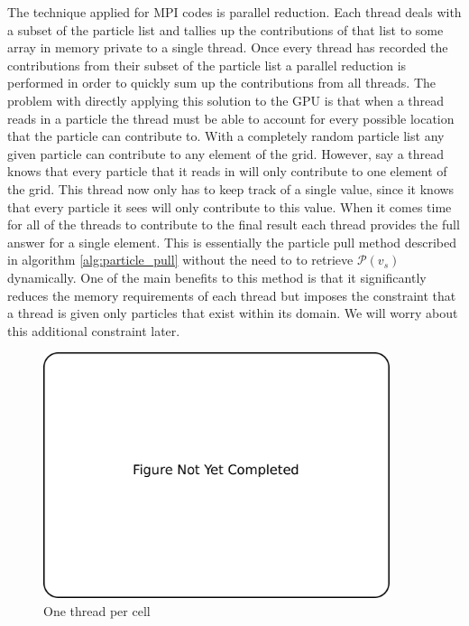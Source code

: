 The technique applied for MPI codes is parallel reduction. Each thread deals with a subset of the particle list and tallies up the contributions of that list to some array in memory private to a single thread. Once every thread has recorded the contributions from their subset of the particle list a parallel reduction is performed in order to quickly sum up the contributions from all threads. The problem with directly applying this solution to the GPU is that when a thread reads in a particle the thread must be able to account for every possible location that the particle can contribute to. With a completely random particle list any given particle can contribute to any element of the grid. However, say a thread knows that every particle that it reads in will only contribute to one element of the grid. This thread now only has to keep track of a single value, since it knows that every particle it sees will only contribute to this value. When it comes time for all of the threads to contribute to the final result each thread provides the full answer for a single element. This is essentially the particle pull method described in algorithm \ref{alg:particle_pull} without the need to to retrieve $\mathcal{P}(v_s)$ dynamically. One of the main benefits to this method is that it significantly reduces the memory requirements of each thread but imposes the constraint that a thread is given only particles that exist within its domain. We will worry about this additional constraint later. 

\begin{figure}
\begin{center}
\includegraphics[width=4in]{introduction/not_finished.pdf}
\end{center}
\caption{One thread per cell}
\label{fig:pic_flowchart_parallel}
\end{figure}

